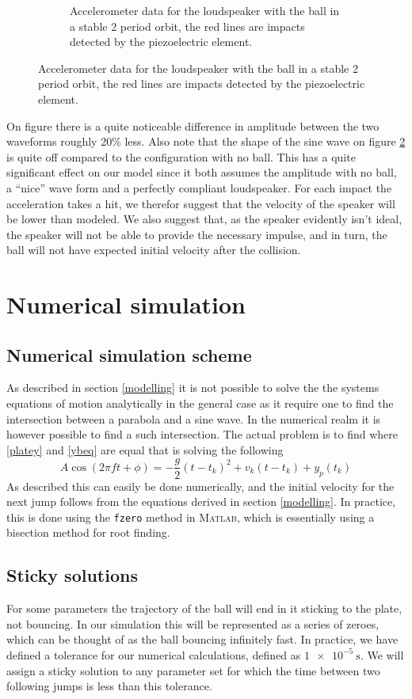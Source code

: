 \documentclass[12pt,oneside,a4paper]{article}
\numberwithin{equation}{section}
\begin{document}
{{{{\begin{figure}[h]
\begin{subfigure}[t]{0.49\textwidth}
	\caption{Accelerometer data for the loudspeaker with the ball in a stable 2 period orbit, the red lines are impacts detected by the piezoelectric element.}
	\label{wball}
\end{subfigure}
\end{figure}
On figure there is a quite noticeable difference in amplitude between the two waveforms roughly 20\% less. Also note that the shape of the sine wave on figure \ref{wball} is quite off compared to the configuration with no ball. This has a quite significant effect on our model since it both assumes the amplitude with no ball, a ``nice'' wave form and a perfectly compliant loudspeaker. For each impact the acceleration takes a hit, we therefor suggest that the velocity of the speaker will be lower than modeled. We also suggest that, as the speaker evidently isn't ideal, the speaker will not be able to provide the necessary impulse, and in turn, the ball will not have expected initial velocity after the collision.
 
\section{Numerical simulation}
\label{Numericalsec}
\subsection{Numerical simulation scheme}
As described in section \ref{modelling} it is not possible to solve the the systems equations of motion analytically in the general case as it require one to find the intersection between a parabola and a sine wave. In the numerical realm it is however possible to find a such intersection. The actual problem is to find where \eqref{platey} and \eqref{ybeq} are equal that is solving the following
\begin{equation}
	A \cos(2\pi f t+ \phi) = -\frac{g}{2}(t-t_k)^2+v_k(t-t_k)+y_p(t_k)
\end{equation}
As described this can easily be done numerically, and the initial velocity for the next jump follows from the equations derived in section \ref{modelling}. In practice, this is done using the \texttt{fzero} method in \textsc{Matlab}, which is essentially using a bisection method for root finding.

\subsection{Sticky solutions}
For some parameters the trajectory of the ball will end in it sticking to the plate, not bouncing. In our simulation this will be represented as a series of zeroes, which can be thought of as the ball bouncing infinitely fast. In practice, we have defined a tolerance for our numerical calculations, defined as $\SI{1e-5}{\second}$. We will assign a sticky solution to any parameter set for which the time between two following jumps is less than this tolerance. 
}}}}
\end{document}

